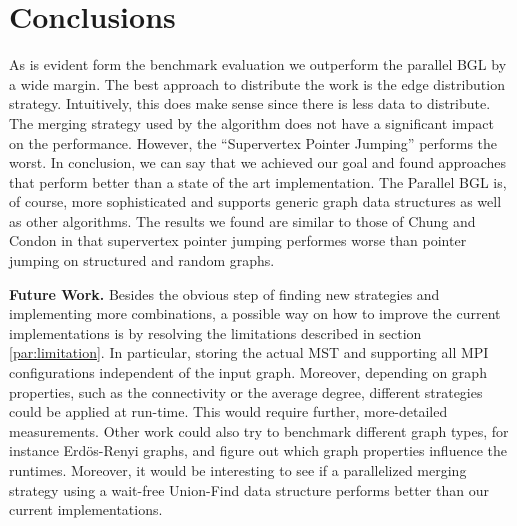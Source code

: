 \documentclass[letterpaper]{article}
\newcommand{\mypar}[1]{{\bf #1.}}
\begin{document}
\section{Conclusions}
As is evident form the benchmark evaluation %
we outperform the parallel BGL by a wide margin. The best approach to distribute the work is the edge distribution
strategy. Intuitively, this does make sense since there is less data to distribute. The merging strategy used by the
algorithm does not have a significant impact on the performance. However, the ``Supervertex Pointer Jumping'' performs
the worst. In conclusion, we can say that we achieved our goal and found approaches that perform better than a state of
the art implementation. The Parallel BGL is, of course, more sophisticated and supports generic graph data structures as
well as other algorithms. The results we found are similar to those of Chung and Condon \cite{chung1996parallel} in that
supervertex pointer jumping performes worse than pointer jumping on structured and random graphs.

\mypar{Future Work}
Besides the obvious step of finding new strategies and implementing more combinations, a possible way on how to improve
the current implementations is by resolving the limitations described in section \ref{par:limitation}. In particular,
storing the actual MST and supporting all MPI configurations independent of the input graph. Moreover, depending on
graph properties, such as the connectivity or the average degree, different strategies could be applied at run-time.
This would require further, more-detailed measurements. Other work could also try to benchmark different graph types,
for instance Erdös-Renyi graphs, and figure out which graph properties influence the runtimes. Moreover, it would be
interesting to see if a parallelized merging strategy using a wait-free Union-Find data structure \cite{wfuf} performs %
better than our current implementations.
\end{document}
